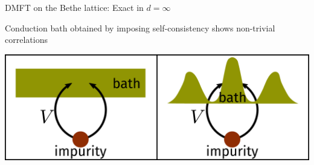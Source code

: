 \documentclass[8pt,aspectratio=169]{beamer}
\newcommand{\nitem}{\item[\ding{51}]}
\begin{document}
\begin{frame}{DMFT on the Bethe lattice: Exact in \(d=\infty\)}
\begin{itemize}
\begin{minipage}{0.4\textwidth}
\nitem Conduction bath obtained by imposing self-consistency shows \alert{non-trivial correlations}
\end{minipage}
\hspace*{\fill}
\begin{minipage}{0.45\textwidth}
\includegraphics[width=\textwidth]{dos_diff.pdf}
\end{minipage}
\end{itemize}
	
\end{frame}
\end{document}
